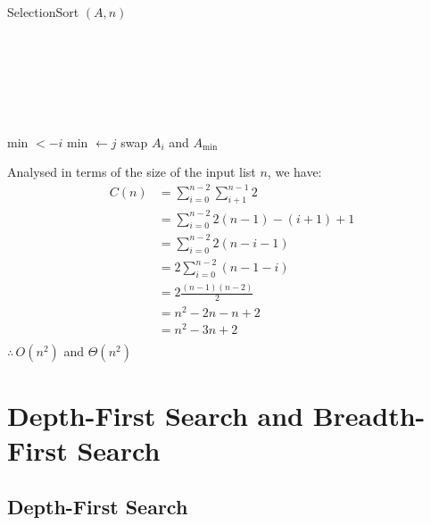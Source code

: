 \documentclass[12pt letter]{report}
\begin{document}
\begin{algorithm}[H]
  \caption{SelectionSort $ \left( A, n \right) $}
  \Comment{}\\
   \\
   \\
   \\
  \begin{algorithmic}[1] \\
    \State min $<- i$
    \State min $ \gets j$
    \EndIf
    \EndFor
    \State swap $A_i$ and $A_{\text{min}}$
    \EndFor
  \end{algorithmic}
\end{algorithm}

Analysed in terms of the size of the input list $n$, we have:
\begin{align*}
  C \left( n \right) & = \displaystyle\sum_{i=0}^{n-2} \displaystyle\sum_{i+1}^{n - 1} 2               \\
                     & = \displaystyle\sum_{i=0}^{n-2} 2 \left( n-1 \right) - \left( i + 1 \right) + 1 \\
                     & = \displaystyle\sum_{i=0}^{n-2} 2 \left( n - i - 1  \right)                     \\
                     & = 2\displaystyle\sum_{i=0}^{n-2} \left( n - 1 - i \right)                       \\
                     & = 2  \frac{ \left( n - 1 \right) \left( n - 2 \right)  }{2}                     \\
                     & = n^2 -2n -n + 2                                                                \\
                     & = n^2 - 3n + 2                                                                  \\
\end{align*}
$\therefore \, O \left( n^2 \right) $ and $ \Theta \left( n^2 \right) $

\chapter{Depth-First Search and Breadth-First Search}

\section{Depth-First Search}
\end{document}
